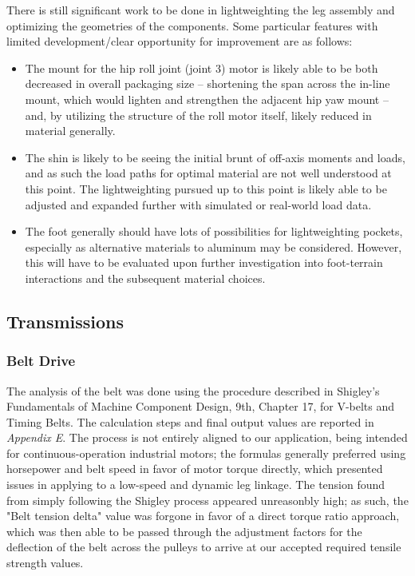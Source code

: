 \documentclass{article}
\begin{document}
There is still significant work to be done in lightweighting the leg assembly and optimizing the geometries of the components. Some particular features with limited development/clear opportunity for improvement are as follows:

\begin{itemize}
    \item The mount for the hip roll joint (joint 3) motor is likely able to be both decreased in overall packaging size -- shortening the span across the in-line mount, which would lighten and strengthen the adjacent hip yaw mount -- and, by utilizing the structure of the roll motor itself, likely reduced in material generally.

    \item The shin is likely to be seeing the initial brunt of off-axis moments and loads, and as such the load paths for optimal material are not well understood at this point. The lightweighting pursued up to this point is likely able to be adjusted and expanded further with simulated or real-world load data. 

    \item The foot generally should have lots of possibilities for lightweighting pockets, especially as alternative materials to aluminum may be considered. However, this will have to be evaluated upon further investigation into foot-terrain interactions and the subsequent material choices.
\end{itemize}

\subsection{Transmissions}

\subsubsection{Belt Drive}

The analysis of the belt was done using the procedure described in Shigley's Fundamentals of Machine Component Design, 9th, Chapter 17, for V-belts and Timing Belts. The calculation steps and final output values are reported in \textit{Appendix E}. The process is not entirely aligned to our application, being intended for continuous-operation industrial motors; the formulas generally preferred using horsepower and belt speed in favor of motor torque directly, which presented issues in applying to a low-speed and dynamic leg linkage. The tension found from simply following the Shigley process appeared unreasonbly high; as such, the "Belt tension delta" value was forgone in favor of a direct torque ratio approach, which was then able to be passed through the adjustment factors for the deflection of the belt across the pulleys to arrive at our accepted required tensile strength values. 
\end{document}
